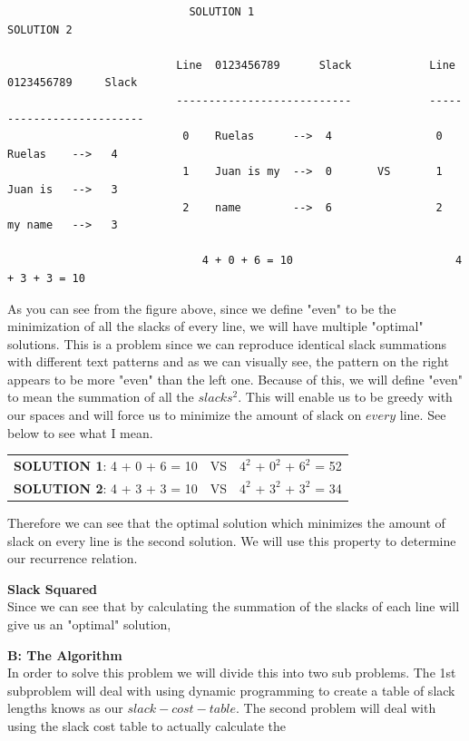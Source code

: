 \documentclass[11pt]{article}
\begin{document}
\begin{solution}
	\hfil
	
		\begin{center}
			\begin{verbatim}
			                SOLUTION 1                             SOLUTION 2
			
				          Line  0123456789      Slack            Line  0123456789     Slack
				          ---------------------------            --------------------------
				           0    Ruelas      -->  4                0    Ruelas    -->   4
				           1    Juan is my  -->  0       VS       1    Juan is   -->   3
				           2    name        -->  6                2    my name   -->   3
				           		                    
				              4 + 0 + 6 = 10                         4 + 3 + 3 = 10                                     	
			\end{verbatim}				
		\end{center} 
		
		As you can see from the figure above, since we define "even" to be the minimization of all the slacks of every line, we will have multiple "optimal" solutions. This is a problem since we can reproduce identical slack summations with different text patterns and as we can visually see, the pattern on the right appears to be more "even" than the left one. Because of this, we will define "even" to mean the summation of all the $slacks^2$. This will enable us to be greedy with our spaces and will force us to minimize the amount of slack on $every$ line. See below to see what I mean.
		
		\hfil
		
		
		\begin{center}
			\begin{tabular}{c c c}
			    \textbf{SOLUTION 1}: 4 + 0 + 6 = 10 & VS & $4^2$ + $0^2$ + $6^2$ = 52 \\
				\textbf{SOLUTION 2}: 4 + 3 + 3 = 10 & VS & $4^2$ + $3^2$ + $3^2$ = 34
			\end{tabular}
		\end{center}
		
		Therefore we can see that the optimal solution which minimizes the amount of slack on every line is the second solution. We will use this property to determine our recurrence relation.  
		
		
		
		\hfil 
		
		\textbf{Slack Squared}\\
		
		Since we can see that by calculating the summation of the slacks of each line will give us an  "optimal" solution, 
	
	\hfil
	
	\textbf{B: The Algorithm} \\
	In order to solve this problem we will divide this into two sub problems. The 1st subproblem will deal with using dynamic programming to create a table of slack lengths knows as our $slack-cost-table$. The second problem will deal with using the slack cost table to actually calculate the 
	
		
	
\end{solution}



\begin{solution}
	
\end{solution}
\end{document}

